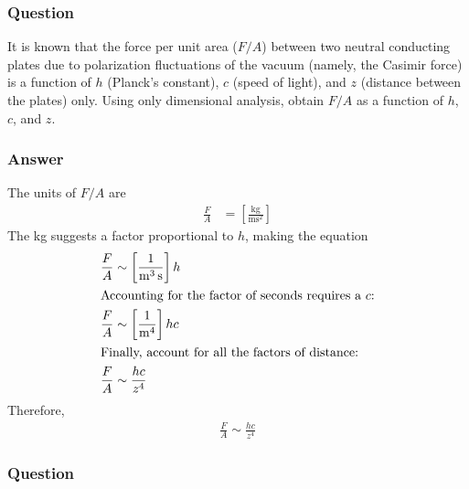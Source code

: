 \subsubsection{Question}

It is known that the force per unit area ($F/A$) between two neutral
conducting plates due to polarization fluctuations of the vacuum (namely,
the Casimir force) is a function of $h$ (Planck's constant), $c$ (speed of
light), and $z$ (distance between the plates) only. Using only dimensional
analysis, obtain $F/A$ as a function of $h$, $c$, and $z$.

\subsubsection{Answer}
The units of $F/A$ are
\begin{align*}
	\frac{F}{A} &= \left[ \frac{\si{\kg}}{\si{\m\s\squared}} \right]
\end{align*}
The \si{\kg} suggests a factor proportional to $h$, making the equation
\begin{align*}
	\frac{F}{A} &\sim \left[ \frac{1}{\si{\m\cubed\s}} \right] h \\
\intertext{Accounting for the factor of seconds requires a $c$:}
	\frac{F}{A} &\sim \left[ \frac{1}{\si{\m\tothe{4}}} \right] hc \\
\intertext{Finally, account for all the factors of distance:}
	\frac{F}{A} &\sim \frac{hc}{z^4} \\
\end{align*}
Therefore,
\begin{align}
	\boxed{
	\frac{F}{A} \sim \frac{hc}{z^4}
	}
\end{align}

\subsubsection{Question}

